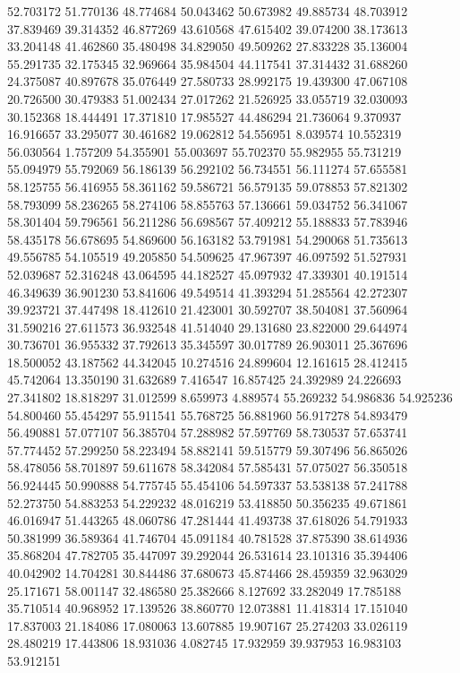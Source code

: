 52.703172
51.770136
48.774684
50.043462
50.673982
49.885734
48.703912
37.839469
39.314352
46.877269
43.610568
47.615402
39.074200
38.173613
33.204148
41.462860
35.480498
34.829050
49.509262
27.833228
35.136004
55.291735
32.175345
32.969664
35.984504
44.117541
37.314432
31.688260
24.375087
40.897678
35.076449
27.580733
28.992175
19.439300
47.067108
20.726500
30.479383
51.002434
27.017262
21.526925
33.055719
32.030093
30.152368
18.444491
17.371810
17.985527
44.486294
21.736064
9.370937
16.916657
33.295077
30.461682
19.062812
54.556951
8.039574
10.552319
56.030564
1.757209
54.355901
55.003697
55.702370
55.982955
55.731219
55.094979
55.792069
56.186139
56.292102
56.734551
56.111274
57.655581
58.125755
56.416955
58.361162
59.586721
56.579135
59.078853
57.821302
58.793099
58.236265
58.274106
58.855763
57.136661
59.034752
56.341067
58.301404
59.796561
56.211286
56.698567
57.409212
55.188833
57.783946
58.435178
56.678695
54.869600
56.163182
53.791981
54.290068
51.735613
49.556785
54.105519
49.205850
54.509625
47.967397
46.097592
51.527931
52.039687
52.316248
43.064595
44.182527
45.097932
47.339301
40.191514
46.349639
36.901230
53.841606
49.549514
41.393294
51.285564
42.272307
39.923721
37.447498
18.412610
21.423001
30.592707
38.504081
37.560964
31.590216
27.611573
36.932548
41.514040
29.131680
23.822000
29.644974
30.736701
36.955332
37.792613
35.345597
30.017789
26.903011
25.367696
18.500052
43.187562
44.342045
10.274516
24.899604
12.161615
28.412415
45.742064
13.350190
31.632689
7.416547
16.857425
24.392989
24.226693
27.341802
18.818297
31.012599
8.659973
4.889574
55.269232
54.986836
54.925236
54.800460
55.454297
55.911541
55.768725
56.881960
56.917278
54.893479
56.490881
57.077107
56.385704
57.288982
57.597769
58.730537
57.653741
57.774452
57.299250
58.223494
58.882141
59.515779
59.307496
56.865026
58.478056
58.701897
59.611678
58.342084
57.585431
57.075027
56.350518
56.924445
50.990888
54.775745
55.454106
54.597337
53.538138
57.241788
52.273750
54.883253
54.229232
48.016219
53.418850
50.356235
49.671861
46.016947
51.443265
48.060786
47.281444
41.493738
37.618026
54.791933
50.381999
36.589364
41.746704
45.091184
40.781528
37.875390
38.614936
35.868204
47.782705
35.447097
39.292044
26.531614
23.101316
35.394406
40.042902
14.704281
30.844486
37.680673
45.874466
28.459359
32.963029
25.171671
58.001147
32.486580
25.382666
8.127692
33.282049
17.785188
35.710514
40.968952
17.139526
38.860770
12.073881
11.418314
17.151040
17.837003
21.184086
17.080063
13.607885
19.907167
25.274203
33.026119
28.480219
17.443806
18.931036
4.082745
17.932959
39.937953
16.983103
53.912151
